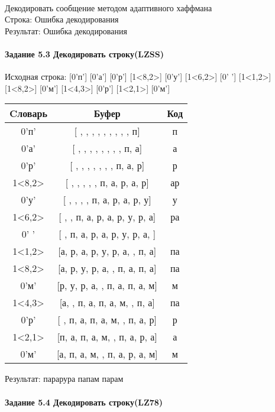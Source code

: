 \documentclass[a4paper, 12pt]{article}
\begin{document}
\\ 

Декодировать сообщение методом адаптивного хаффмана \\
Строка: 
Ошибка декодирования\\
Результат: Ошибка декодирования
\pagebreak
\paragraph{Задание 5.3 Декодировать строку(LZSS)\\}

Исходная строка: [0'п'] [0'а'] [0'р'] [1<8,2>] [0'у'] [1<6,2>] [0' '] [1<1,2>] [1<8,2>] [0'м'] [1<4,3>] [0'р'] [1<2,1>] [0'м']\\
\begin{table}[h!]
\centering
\begin{tabular}{|c|c|c|}
\hline
 Cловарь & Буфер & Код  \\ \hline
0'п' & [ ,  ,  ,  ,  ,  ,  ,  ,  , п] & п
\\ \hline
0'а' & [ ,  ,  ,  ,  ,  ,  ,  , п, а] & а
\\ \hline
0'р' & [ ,  ,  ,  ,  ,  ,  , п, а, р] & р
\\ \hline
1<8,2> & [ ,  ,  ,  ,  , п, а, р, а, р] & ар
\\ \hline
0'у' & [ ,  ,  ,  , п, а, р, а, р, у] & у
\\ \hline
1<6,2> & [ ,  , п, а, р, а, р, у, р, а] & ра
\\ \hline
0' ' & [ , п, а, р, а, р, у, р, а,  ] &  
\\ \hline
1<1,2> & [а, р, а, р, у, р, а,  , п, а] & па
\\ \hline
1<8,2> & [а, р, у, р, а,  , п, а, п, а] & па
\\ \hline
0'м' & [р, у, р, а,  , п, а, п, а, м] & м
\\ \hline
1<4,3> & [а,  , п, а, п, а, м,  , п, а] &  па
\\ \hline
0'р' & [ , п, а, п, а, м,  , п, а, р] & р
\\ \hline
1<2,1> & [п, а, п, а, м,  , п, а, р, а] & а
\\ \hline
0'м' & [а, п, а, м,  , п, а, р, а, м] & м
\\ \hline
\end{tabular}
\end{table}

Результат: парарура папам парам
\pagebreak
\paragraph{Задание 5.4 Декодировать строку(LZ78)\\}
\end{document}
